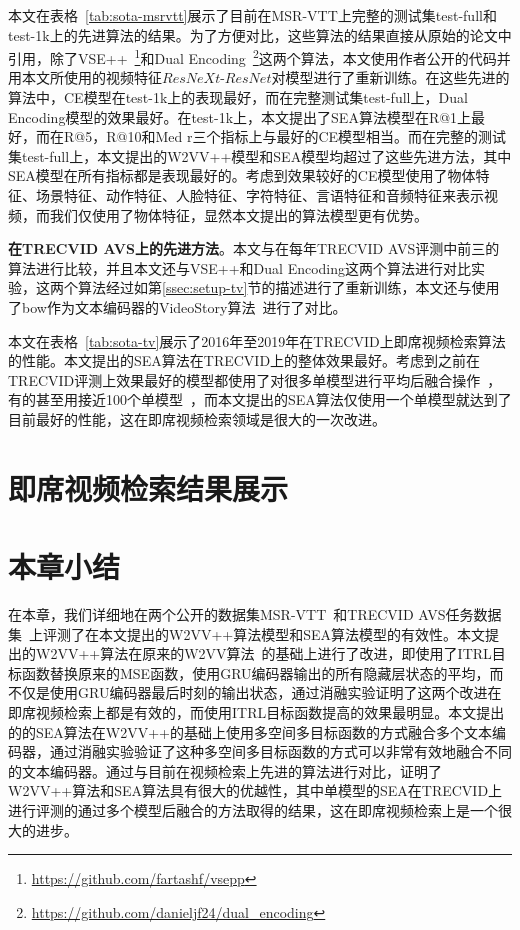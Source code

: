 本文在表格~\ref{tab:sota-msrvtt}展示了目前在MSR-VTT上完整的测试集test-full和test-1k上的先进算法的结果。为了方便对比，这些算法的结果直接从原始的论文中引用，除了VSE++~\footnote{\url{https://github.com/fartashf/vsepp}}和Dual Encoding~\footnote{\url{https://github.com/danieljf24/dual_encoding}}这两个算法，本文使用作者公开的代码并用本文所使用的视频特征$ResNeXt$-$ResNet$对模型进行了重新训练。在这些先进的算法中，CE模型在test-1k上的表现最好，而在完整测试集test-full上，Dual Encoding模型的效果最好。在test-1k上，本文提出了SEA算法模型在R@1上最好，而在R@5，R@10和Med r三个指标上与最好的CE模型相当。而在完整的测试集test-full上，本文提出的W2VV++模型和SEA模型均超过了这些先进方法，其中SEA模型在所有指标都是表现最好的。考虑到效果较好的CE模型使用了物体特征、场景特征、动作特征、人脸特征、字符特征、言语特征和音频特征来表示视频，而我们仅使用了物体特征，显然本文提出的算法模型更有优势。



\textbf{在TRECVID AVS上的先进方法}。本文与在每年TRECVID AVS评测中前三的算法进行比较，并且本文还与VSE++和Dual Encoding这两个算法进行对比实验，这两个算法经过如第\ref{ssec:setup-tv}节的描述进行了重新训练，本文还与使用了bow作为文本编码器的VideoStory算法~\cite{habibian2017video2vec}进行了对比。

本文在表格~\ref{tab:sota-tv}展示了2016年至2019年在TRECVID上即席视频检索算法的性能。本文提出的SEA算法在TRECVID上的整体效果最好。考虑到之前在TRECVID评测上效果最好的模型都使用了对很多单模型进行平均后融合操作~\cite{snoek2017university,li2018renmin,wu2019hybrid}，有的甚至用接近100个单模型~\cite{ueki2019waseda}，而本文提出的SEA算法仅使用一个单模型就达到了目前最好的性能，这在即席视频检索领域是很大的一次改进。




\section{即席视频检索结果展示}


\section{本章小结}
在本章，我们详细地在两个公开的数据集MSR-VTT~\cite{msrvtt}和TRECVID AVS任务数据集~\cite{awad2016trecvid}上评测了在本文提出的W2VV++算法模型和SEA算法模型的有效性。本文提出的W2VV++算法在原来的W2VV算法~\cite{dong2018predicting}的基础上进行了改进，即使用了ITRL目标函数替换原来的MSE函数，使用GRU编码器输出的所有隐藏层状态的平均，而不仅是使用GRU编码器最后时刻的输出状态，通过消融实验证明了这两个改进在即席视频检索上都是有效的，而使用ITRL目标函数提高的效果最明显。本文提出的的SEA算法在W2VV++的基础上使用多空间多目标函数的方式融合多个文本编码器，通过消融实验验证了这种多空间多目标函数的方式可以非常有效地融合不同的文本编码器。通过与目前在视频检索上先进的算法进行对比，证明了W2VV++算法和SEA算法具有很大的优越性，其中单模型的SEA在TRECVID上进行评测的通过多个模型后融合的方法取得的结果，这在即席视频检索上是一个很大的进步。

